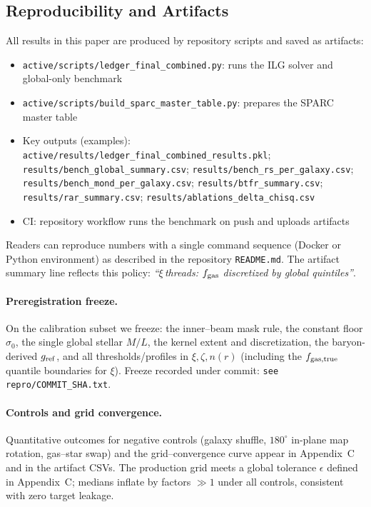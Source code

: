 \documentclass[usenatbib]{mnras}
\begin{document}
\subsection{Reproducibility and Artifacts}

All results in this paper are produced by repository scripts and saved as artifacts:
\begin{itemize}
  \item \texttt{active/scripts/ledger\_final\_combined.py}: runs the ILG solver and global-only benchmark
  \item \texttt{active/scripts/build\_sparc\_master\_table.py}: prepares the SPARC master table
  \item Key outputs (examples): \texttt{active/results/ledger\_final\_combined\_results.pkl}; \texttt{results/bench\_global\_summary.csv}; \texttt{results/bench\_rs\_per\_galaxy.csv}; \texttt{results/bench\_mond\_per\_galaxy.csv}; \texttt{results/btfr\_summary.csv}; \texttt{results/rar\_summary.csv}; \texttt{results/ablations\_delta\_chisq.csv}
  \item CI: repository workflow runs the benchmark on push and uploads artifacts
\end{itemize}

Readers can reproduce numbers with a single command sequence (Docker or Python environment) as described in the repository \texttt{README.md}. The artifact summary line reflects this policy: \emph{``$\xi$\,threads: $f_{\rm gas}$ discretized by global quintiles''}.
\paragraph{Preregistration freeze.} On the calibration subset we freeze: the inner–beam mask rule, the constant floor $\sigma_0$, the single global stellar $M/L$, the kernel extent and discretization, the baryon-derived $g_{\rm ref}$, and all thresholds/profiles in $\xi,\zeta,n(r)$ (including the $f_{\rm gas,true}$ quantile boundaries for $\xi$). Freeze recorded under commit: \texttt{see repro/COMMIT\_SHA.txt}.

\paragraph{Controls and grid convergence.} Quantitative outcomes for negative controls (galaxy shuffle, $180^\circ$ in-plane map rotation, gas–star swap) and the grid–convergence curve appear in Appendix~C and in the artifact CSVs. The production grid meets a global tolerance $\epsilon$ defined in Appendix~C; medians inflate by factors $\gg 1$ under all controls, consistent with zero target leakage.
\end{document}
